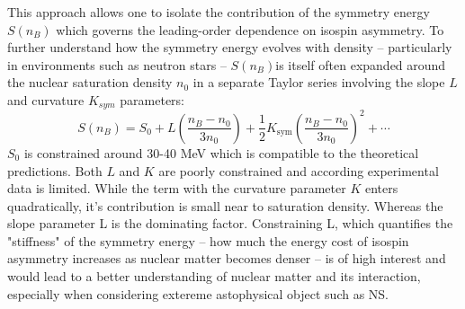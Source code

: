 This approach allows one to isolate the contribution of the symmetry energy $S(n_B)$  which governs the leading-order dependence on isospin asymmetry.\newline
To further understand how the symmetry energy evolves with density -- particularly in environments such as neutron stars -- $S(n_B) $is itself often expanded around the nuclear saturation density $n_0$ in a separate Taylor series involving the slope $L$ and curvature $K_{sym}$ parameters:
\begin{equation}
S(n_B) = S_0 + L \left( \frac{n_B - n_0}{3n_0} \right) + \frac{1}{2} K_{\text{sym}} \left( \frac{n_B - n_0}{3n_0} \right)^2 + \cdots
\end{equation}
$S_0$ is constrained around 30-40 MeV which is compatible to the theoretical predictions. Both $L$ and $K$ are poorly constrained and according experimental data is limited. While the term with the curvature parameter $K$ enters quadratically, it’s contribution is small near to saturation density.\newline
Whereas the slope parameter L is the dominating factor. Constraining L, which quantifies the "stiffness" of the symmetry energy -- how much the energy cost of isospin asymmetry increases as nuclear matter becomes denser -- is of high interest and would lead to a better understanding of nuclear matter and its interaction, especially when considering extereme astophysical object such as NS. 





